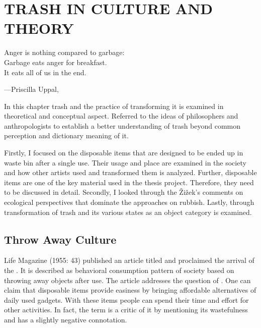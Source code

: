 \chapter{TRASH IN CULTURE AND THEORY}



\begin{singlespace}
\epigraph{Anger is nothing compared to garbage:\\Garbage eats anger for breakfast.\\It eats all of us in the end.}{\hfill---Priscilla Uppal, }
\end{singlespace}



In this chapter trash and the practice of transforming it is examined in theoretical and conceptual aspect. Referred to the ideas of philosophers and anthropologists to establish a better understanding of trash beyond common perception and dictionary meaning of it.

Firstly, I focused on the disposable items that are designed to be ended up in waste bin after a single use. Their usage and place are examined in the society and how other artists used and transformed them is analyzed. Further, disposable items are one of the key material used in the thesis project. Therefore, they need to be discussed in detail. Secondly, I looked through the Žižek’s comments on ecological perspectives that dominate the approaches on rubbish. Lastly, through  transformation of trash and its various states as an object category is examined.



\section{Throw Away Culture}

Life Magazine (1955: 43) published an article titled  and proclaimed the arrival of the . It is described as behavioral consumption pattern of society based on throwing away objects after use. The article addresses the question of  \citep{tully2014throw}. One can claim that disposable items provide easiness by bringing affordable alternatives of daily used gadgets. With these items people can spend their time and effort for other activities. In fact, the term  is a critic of it by mentioning its wastefulness and has a slightly negative connotation.

